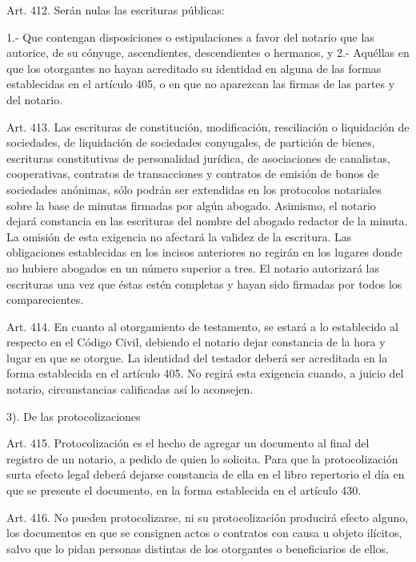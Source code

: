     Art. 412. Serán nulas las escrituras públicas:

    1.- Que contengan disposiciones o estipulaciones a favor del notario que las autorice, de su cónyuge, ascendientes, descendientes o hermanos, y
    2.- Aquéllas en que los otorgantes no hayan acreditado su identidad en alguna de las formas establecidas en el artículo 405, o en que no aparezcan las firmas de las partes y del notario.


    Art. 413. Las escrituras de constitución, modificación, resciliación o liquidación de sociedades, de liquidación de sociedades conyugales, de partición de bienes, escrituras constitutivas de personalidad jurídica, de asociaciones de canalistas, cooperativas, contratos de transacciones y contratos de emisión de bonos de sociedades anónimas, sólo podrán ser extendidas en los protocolos notariales sobre la base de minutas firmadas por algún abogado.
    Asimismo, el notario dejará constancia en las escrituras del nombre del abogado redactor de la minuta. La omisión de esta exigencia no afectará la validez de la escritura.
    Las obligaciones establecidas en los incisos anteriores no regirán en los lugares donde no hubiere abogados en un número superior a tres.
    El notario autorizará las escrituras una vez que éstas estén completas y hayan sido firmadas por todos los comparecientes.



    Art. 414. En cuanto al otorgamiento de testamento, se estará a lo establecido al respecto en el Código Civil, debiendo el notario dejar constancia de la hora y lugar en que se otorgue. La identidad del testador deberá ser acreditada en la forma establecida en el artículo 405. No regirá esta exigencia cuando, a juicio del notario, circunstancias calificadas así lo aconsejen.


    3). De las protocolizaciones


    Art. 415. Protocolización es el hecho de agregar un documento al final del registro de un notario, a pedido de quien lo solicita.
    Para que la protocolización surta efecto legal deberá dejarse constancia de ella en el libro repertorio el día en que se presente el documento, en la forma establecida en el artículo 430.


    Art. 416. No pueden protocolizarse, ni su protocolización producirá efecto alguno, los documentos en que se consignen actos o contratos con causa u objeto ilícitos, salvo que lo pidan personas distintas de los otorgantes o beneficiarios de ellos.


